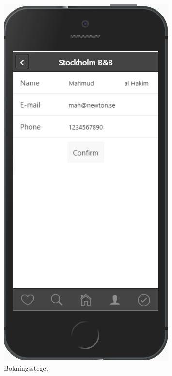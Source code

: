 \documentclass[a4paper]{article}
\begin{document}
\begin{figure}
\begin{subfigure}{.3\textwidth}
  \includegraphics[width=.8\linewidth]{book.jpg}
  \caption{Bokningssteget}
  \label{fig:sfig5}
\end{subfigure}
\begin{subfigure}{.3\textwidth}
  \centering

\end{subfigure}
\end{figure}
\end{document}
